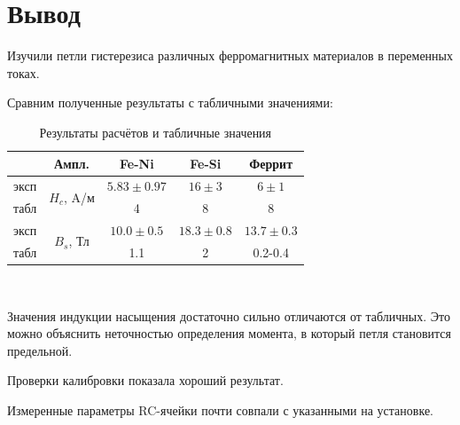\documentclass[a4paper, 12pt]{article}
\begin{document}
    \section{Вывод}

        Изучили петли гистерезиса различных ферромагнитных материалов в переменных токах.

        Сравним полученные результаты с табличными значениями:

        \begin{table}[!ht]
            \centering
            \begin{tabular}{|c|c|c|c|c|}
                \hline
                & Ампл. & Fe-Ni & Fe-Si & Феррит \\ \hline
                эксп & \multirow{2}{*}{$H_c$, A/м} & $5.83 \pm 0.97$ & $16 \pm 3$ & $6 \pm 1$ \\ \cline{1-1} \cline{3-5}
                табл &  & 4 & 8 & 8 \\ \hline
                эксп & \multirow{2}{*}{$B_s$, Тл} & $10.0 \pm 0.5$ & $18.3 \pm 0.8$ & $13.7 \pm 0.3$ \\ \cline{1-1} \cline{3-5}
                табл &  & 1.1 & 2 & 0.2-0.4 \\ \hline
            \end{tabular}\\
            \caption{Результаты расчётов и табличные значения}
            \label{tab:tab_and_res}
        \end{table}

        Значения индукции насыщения достаточно сильно отличаются от табличных. Это можно объяснить неточностью определения момента, в который петля становится предельной.

        Проверки калибровки показала хороший результат.

        Измеренные параметры RC-ячейки почти совпали с указанными на установке.
\end{document}
